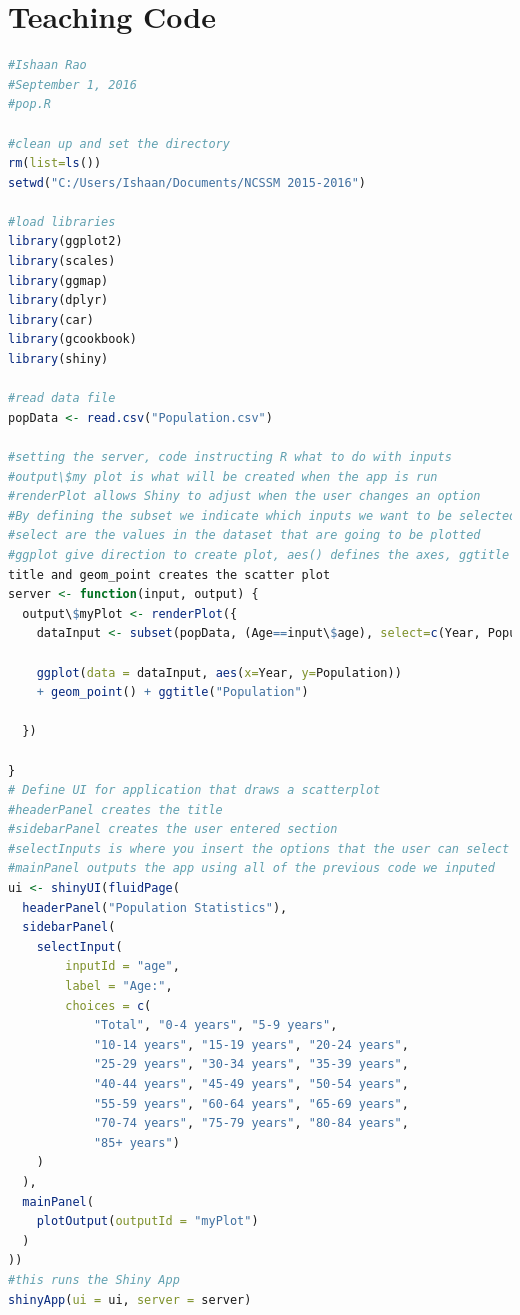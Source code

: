 \section{Teaching Code}
\begin{lstlisting}[language = R]
#Ishaan Rao
#September 1, 2016
#pop.R

#clean up and set the directory
rm(list=ls())
setwd("C:/Users/Ishaan/Documents/NCSSM 2015-2016")

#load libraries
library(ggplot2)
library(scales)
library(ggmap)
library(dplyr)
library(car)
library(gcookbook)
library(shiny)

#read data file
popData <- read.csv("Population.csv")

#setting the server, code instructing R what to do with inputs
#output\$my plot is what will be created when the app is run
#renderPlot allows Shiny to adjust when the user changes an option
#By defining the subset we indicate which inputs we want to be selected by the user
#select are the values in the dataset that are going to be plotted
#ggplot give direction to create plot, aes() defines the axes, ggtitle creates 
title and geom_point creates the scatter plot
server <- function(input, output) {
  output\$myPlot <- renderPlot({
    dataInput <- subset(popData, (Age==input\$age), select=c(Year, Population, State))
    
    ggplot(data = dataInput, aes(x=Year, y=Population)) 
    + geom_point() + ggtitle("Population")
    
  })
  
}
# Define UI for application that draws a scatterplot
#headerPanel creates the title
#sidebarPanel creates the user entered section
#selectInputs is where you insert the options that the user can select
#mainPanel outputs the app using all of the previous code we inputed
ui <- shinyUI(fluidPage(
  headerPanel("Population Statistics"),
  sidebarPanel(
    selectInput(
        inputId = "age", 
        label = "Age:", 
        choices = c(
            "Total", "0-4 years", "5-9 years", 
            "10-14 years", "15-19 years", "20-24 years", 
            "25-29 years", "30-34 years", "35-39 years", 
            "40-44 years", "45-49 years", "50-54 years", 
            "55-59 years", "60-64 years", "65-69 years", 
            "70-74 years", "75-79 years", "80-84 years", 
            "85+ years")
    )
  ),
  mainPanel(
    plotOutput(outputId = "myPlot")
  )
))
#this runs the Shiny App
shinyApp(ui = ui, server = server)

\end{lstlisting}

